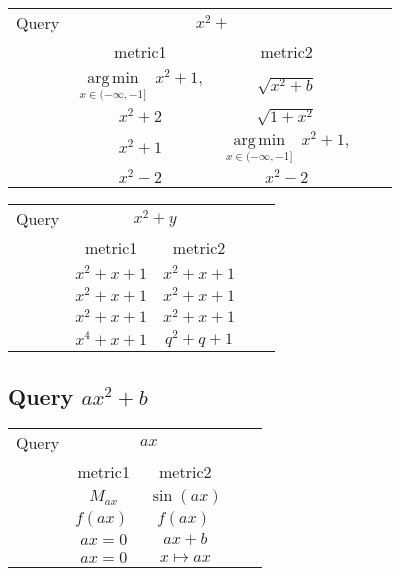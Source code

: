 \documentclass[12pt]{article} %
\begin{document}
\begin{center}
\begin{tabular}{lcccc}
Query  & \multicolumn{2}{c}{ $x^2 + $ } \\ & metric1 & metric2 \\
\hline
 &  $  \underset{x\in(-\infty,-1]}{\operatorname{arg\,min}}\;x^{2}+1,  $ & $
\sqrt{x^{2}+b} $ \\
 &  $  x^{2}+2                  $ & $      \sqrt{1+x^{2}}                          $ \\
 &  $ x^{2}+1                   $ & $   \underset{x\in(-\infty,-1]}{\operatorname{arg\,min}}\;x^{2}+1,   $ \\
 &  $ x^{2}-2                   $ & $   x^{2}-2           $ \\
\end{tabular}
\end{center}


\begin{center}
\begin{tabular}{lcccc}
Query  & \multicolumn{2}{c}{ $x^2 + y$ } \\ & metric1 & metric2 \\
\hline
 &  $  x^{2}+x+1   $ & $    x^{2}+x+1                            $ \\
 &  $  x^{2}+x+1   $ & $    x^{2}+x+1                                $ \\
 &  $  x^{2}+x+1   $ & $    x^{2}+x+1                               $ \\
 &  $  x^{4}+x+1   $ & $    q^{2}+q+1                               $ \\
\end{tabular}
\end{center}

\pagebreak

\subsection{Query $ax^2+b$}

\begin{center}
\begin{tabular}{lcccc}
Query  & \multicolumn{2}{c}{ $ax$ } \\ & metric1 & metric2 \\
\hline
 &  $  M_{ax}   $ & $    \displaystyle\sin(ax)                        $ \\
 &  $  \displaystyle f(ax)\   $ & $    \displaystyle f(ax)\,           $ \\
 &  $  ax=0   $ & $    ax+b                     $ \\
 &  $  ax=0   $ & $    x\mapsto ax                     $ \\
\end{tabular}
\end{center}
\end{document}
